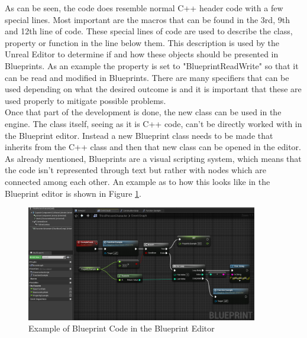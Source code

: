 As can be seen, the code does resemble normal C++ header code with a few special lines. Most important are the macros that can be found in the 3rd, 9th and 12th line of code. These special lines of code are used to describe the class, property or function in the line below them. This description is used by the Unreal Editor to determine if and how these objects should be presented in Blueprints. As an example the property is set to "BlueprintReadWrite" so that it can be read and modified in Blueprints. There are many specifiers that can be used depending on what the desired outcome is and it is important that these are used properly to mitigate possible problems.\\
 
Once that part of the development is done, the new class can be used in the engine. The class itself, seeing as it is C++ code, can't be directly worked with in the Blueprint editor. Instead a new Blueprint class needs to be made that inherits from the C++ class and then that new class can be opened in the editor.\\
As already mentioned, Blueprints are a visual scripting system, which means that the code isn't represented through text but rather with nodes which are connected among each other. An example as to how this looks like in the Blueprint editor is shown in Figure \ref{fig:BlueprintExample}.

\begin{figure}[htpb]
	\centering
	\includegraphics[width=0.9\textwidth]{fig/BlueprintExample.png}
	\caption[Example Blueprint Code]{Example of Blueprint Code in the Blueprint Editor\protect}
	\label{fig:BlueprintExample}
\end{figure}

